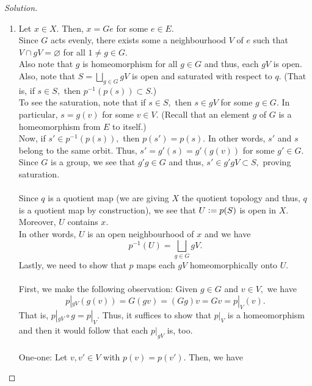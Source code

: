 \documentclass[12pt]{article}
\theoremstyle{definition}
\numberwithin{thm}{section}
\let\emptyset\varnothing
\newenvironment{soln}{\begin{proof}[Solution]}{\end{proof}}
\begin{document}
\begin{soln}
	\phantom{hi}
	\begin{enumerate}
		\item Let $x \in X.$ Then, $x = Ge$ for some $e \in E.$\\
		Since $G$ acts evenly, there exists some a neighbourhood $V$ of $e$ such that $V \cap gV = \emptyset$ for all $1 \neq g \in G.$\\
		Also note that $g$ is homeomorphism for all $g \in G$ and thus, each $gV$ is open.\\
		Also, note that $S = \displaystyle\bigsqcup_{g \in G}gV$ is open and saturated with respect to $q.$ (That is, if $s \in S,$ then $p^{-1}(p(s)) \subset S.$)\\
		To see the saturation, note that if $s \in S,$ then $s \in gV$ for some $g \in G.$ In particular, $s = g(v)$ for some $v \in V.$ (Recall that an element $g$ of $G$ is a homeomorphism from $E$ to itself.)\\
		Now, if $s' \in p^{-1}(p(s)),$ then $p(s') = p(s).$ In other words, $s'$ and $s$ belong to the same orbit. Thus, $s' = g'(s) = g'(g(v))$ for some $g' \in G.$\\
		Since $G$ is a group, we see that $g'g \in G$ and thus, $s' \in g'gV \subset S,$ proving saturation.\\~\\
		Since $q$ is a quotient map (we are giving $X$ the quotient topology and thus, $q$ is a quotient map by construction), we see that $U \vcentcolon= p(S)$ is open in $X.$ Moreover, $U$ contains $x.$\\
		In other words, $U$ is an open neighbourhood of $x$ and we have
		\begin{equation*} 
			p^{-1}(U) = \bigsqcup_{g \in G} gV.
		\end{equation*}
		Lastly, we need to show that $p$ maps each $gV$ homeomorphically onto $U.$\\~\\
		First, we make the following observation: Given $g \in G$ and $v \in V,$ we have
		\begin{equation*} 
			p|_{gV}(g(v)) = G(gv) = (Gg)v = Gv = p|_V(v).	
		\end{equation*}
		That is, $p|_{gV}\circ g = p|_V.$ Thus, it suffices to show that $p|_V$ is a homeomorphism and then it would follow that each $p|_{gV}$ is, too.\\~\\
		One-one: Let $v, v' \in V$ with $p(v) = p(v').$ Then, we have
		\begin{equation*} 

\end{equation*}
\end{enumerate}
\end{soln}
\end{document}
